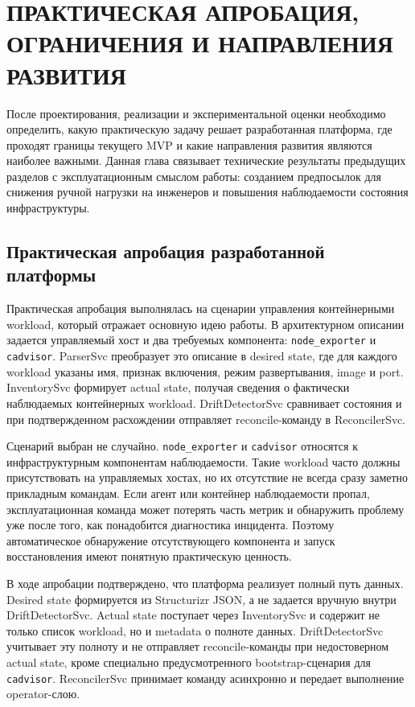 \section{ПРАКТИЧЕСКАЯ АПРОБАЦИЯ, ОГРАНИЧЕНИЯ И НАПРАВЛЕНИЯ РАЗВИТИЯ}

После проектирования, реализации и экспериментальной оценки необходимо определить, какую практическую задачу решает разработанная платформа, где проходят границы текущего MVP и какие направления развития являются наиболее важными. Данная глава связывает технические результаты предыдущих разделов с эксплуатационным смыслом работы: созданием предпосылок для снижения ручной нагрузки на инженеров и повышения наблюдаемости состояния инфраструктуры.

\subsection{Практическая апробация разработанной платформы}

Практическая апробация выполнялась на сценарии управления контейнерными workload, который отражает основную идею работы. В архитектурном описании задается управляемый хост и два требуемых компонента: \texttt{node\_exporter} и \texttt{cadvisor}. ParserSvc преобразует это описание в desired state, где для каждого workload указаны имя, признак включения, режим развертывания, image и port. InventorySvc формирует actual state, получая сведения о фактически наблюдаемых контейнерных workload. DriftDetectorSvc сравнивает состояния и при подтвержденном расхождении отправляет reconcile-команду в ReconcilerSvc.

Сценарий выбран не случайно. \texttt{node\_exporter} и \texttt{cadvisor} относятся к инфраструктурным компонентам наблюдаемости. Такие workload часто должны присутствовать на управляемых хостах, но их отсутствие не всегда сразу заметно прикладным командам. Если агент или контейнер наблюдаемости пропал, эксплуатационная команда может потерять часть метрик и обнаружить проблему уже после того, как понадобится диагностика инцидента. Поэтому автоматическое обнаружение отсутствующего компонента и запуск восстановления имеют понятную практическую ценность.

В ходе апробации подтверждено, что платформа реализует полный путь данных. Desired state формируется из Structurizr JSON, а не задается вручную внутри DriftDetectorSvc. Actual state поступает через InventorySvc и содержит не только список workload, но и metadata о полноте данных. DriftDetectorSvc учитывает эту полноту и не отправляет reconcile-команды при недостоверном actual state, кроме специально предусмотренного bootstrap-сценария для \texttt{cadvisor}. ReconcilerSvc принимает команду асинхронно и передает выполнение operator-слою.


